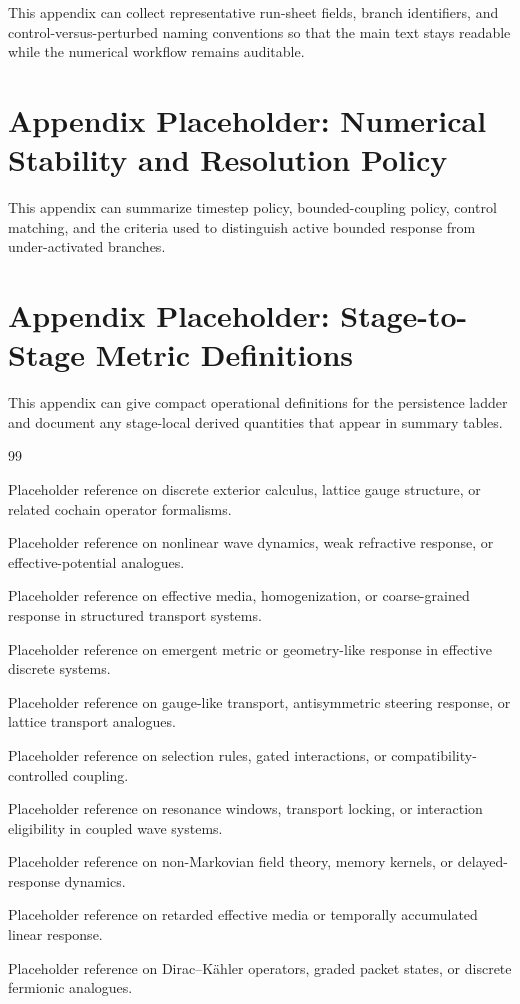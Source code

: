 \documentclass[11pt]{article}
\begin{document}
This appendix can collect representative run-sheet fields, branch identifiers, and control-versus-perturbed naming conventions so that the main text stays readable while the numerical workflow remains auditable.

\section{Appendix Placeholder: Numerical Stability and Resolution Policy}

This appendix can summarize timestep policy, bounded-coupling policy, control matching, and the criteria used to distinguish active bounded response from under-activated branches.

\section{Appendix Placeholder: Stage-to-Stage Metric Definitions}

This appendix can give compact operational definitions for the persistence ladder and document any stage-local derived quantities that appear in summary tables.

\begin{thebibliography}{99}

Placeholder reference on discrete exterior calculus, lattice gauge structure, or related cochain operator formalisms.

Placeholder reference on nonlinear wave dynamics, weak refractive response, or effective-potential analogues.

Placeholder reference on effective media, homogenization, or coarse-grained response in structured transport systems.

Placeholder reference on emergent metric or geometry-like response in effective discrete systems.

Placeholder reference on gauge-like transport, antisymmetric steering response, or lattice transport analogues.

Placeholder reference on selection rules, gated interactions, or compatibility-controlled coupling.

Placeholder reference on resonance windows, transport locking, or interaction eligibility in coupled wave systems.

Placeholder reference on non-Markovian field theory, memory kernels, or delayed-response dynamics.

Placeholder reference on retarded effective media or temporally accumulated linear response.

Placeholder reference on Dirac--K\"ahler operators, graded packet states, or discrete fermionic analogues.

\end{thebibliography}
\end{document}

